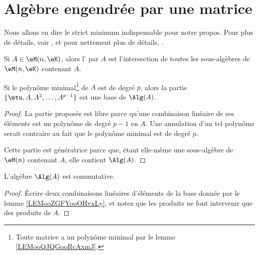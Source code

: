 
\section{Algèbre engendrée par une matrice}

Nous allons en dire le strict minimum indispensable pour notre propos. Pour plus de détails, voir \cite{BIBooYLFXooSFCrlS}, et pour nettement plus de détails, \cite{Landsman}.

\begin{definition}      \label{DEFooXPFVooZzPXEK}
	Si \( A\in \eM(n, \eK)\), alors l' par \( A\) est l'intersection de toutes les sous-algèbres de \( \eM(n,\eK)\) contenant \( A\).
\end{definition}

\begin{lemma}     \label{LEMooZGFYooOHvxLy}
	Si le polynôme minimal\footnote{Toute matrice a un polynôme minimal par le lemme \ref{LEMooQJQGooRcAxmJ}.} de \( A\) est de degré \( p\), alors la partie \( \{ \mtu, A, A^2,\ldots, A^{p-1} \}\) est une base de \( \Alg(A)\).
\end{lemma}

\begin{proof}
	La partie proposée est libre parce qu'une combinaison linéaire de ses éléments est un polynôme de degré \( p-1\) en \( A\). Une annulation d'un tel polynôme serait contraire au fait que le polynôme minimal est de degré \( p\).

	Cette partie est génératrice parce que, étant elle-même une sous-algèbre de \( \eM(n)\) contenant \( A\), elle contient \( \Alg(A)\).
\end{proof}

\begin{corollary}       \label{CORooQTUQooDtjljc}
	L'algèbre \( \Alg(A)\) est commutative.
\end{corollary}

\begin{proof}
	Écrire deux combinaisons linéaires d'éléments de la base donnée par le lemme \ref{LEMooZGFYooOHvxLy}, et notez que les produits ne font intervenir que des produits de \( A\).
\end{proof}


